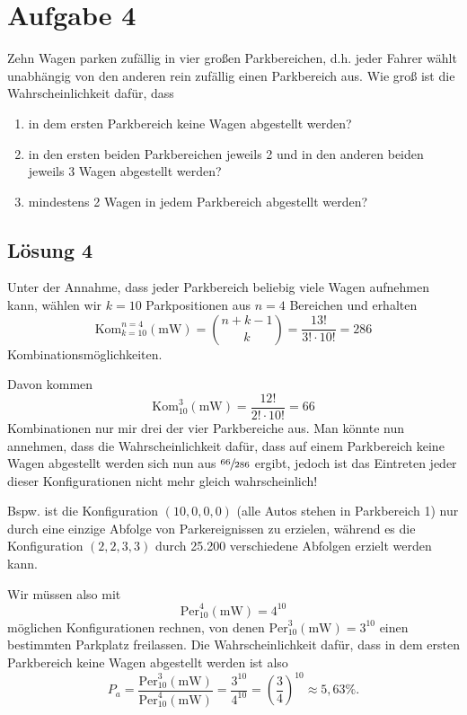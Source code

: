 \documentclass[main.tex]{subfiles}
\begin{document}
\section{Aufgabe 4}
Zehn Wagen parken zufällig in vier großen Parkbereichen, d.h. jeder Fahrer wählt unabhängig von den anderen rein zufällig einen Parkbereich aus. Wie groß ist die Wahrscheinlichkeit dafür, dass
\begin{enumerate}
    \item in dem ersten Parkbereich keine Wagen abgestellt werden?
    \item in den ersten beiden Parkbereichen jeweils 2 und in den anderen beiden jeweils 3 Wagen abgestellt werden?
    \item mindestens 2 Wagen in jedem Parkbereich abgestellt werden?
\end{enumerate}

\subsection{Lösung 4}
Unter der Annahme, dass jeder Parkbereich beliebig viele Wagen aufnehmen kann, wählen wir $k=10$ Parkpositionen aus $n=4$ Bereichen und erhalten
$$
    \text{Kom}^{n=4}_{k=10}(\text{mW})
    = \binom{n+k-1}{k}
    = \frac{13!}{3!\cdot 10!}
    = 286
$$
Kombinationsmöglichkeiten.

Davon kommen
$$
    \text{Kom}^{3}_{10}(\text{mW})
    = \frac{12!}{2!\cdot 10!}
    = 66
$$
Kombinationen nur mir drei der vier Parkbereiche aus. Man könnte nun annehmen, dass die Wahrscheinlichkeit dafür, dass auf einem Parkbereich keine Wagen abgestellt werden sich nun aus $\sfrac{66}{286}$ ergibt, jedoch ist das Eintreten jeder dieser Konfigurationen nicht mehr gleich wahrscheinlich!

Bspw. ist die Konfiguration $(10, 0, 0, 0)$ (alle Autos stehen in Parkbereich 1) nur durch eine einzige Abfolge von Parkereignissen zu erzielen, während es die Konfiguration $(2, 2, 3, 3)$ durch 25.200 verschiedene Abfolgen erzielt werden kann.

Wir müssen also mit
$$
    \text{Per}^{4}_{10}(\text{mW})
    = 4^{10}
$$
möglichen Konfigurationen rechnen, von denen $\text{Per}^{3}_{10}(\text{mW}) = 3^{10}$ einen bestimmten Parkplatz freilassen. Die Wahrscheinlichkeit dafür, dass in dem ersten Parkbereich keine Wagen abgestellt werden ist also
$$
    P_a = \frac{\text{Per}^{3}_{10}(\text{mW})}{\text{Per}^{4}_{10}(\text{mW})} = \frac{3^{10}}{4^{10}} = \left(\frac{3}{4}\right)^{10} \approx 5,63\%.
$$
\end{document}
